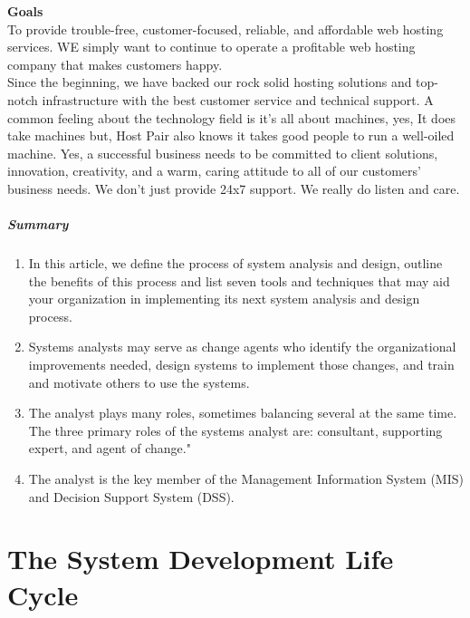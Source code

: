 \documentclass[a4paper,12pt]{report}
\begin{document}
\textbf{Goals}\\
To provide trouble-free, customer-focused, reliable, and affordable web hosting services. WE simply want
to continue to operate a profitable web hosting company that makes customers happy. \\Since the
beginning, we have backed our rock solid hosting solutions and top-notch infrastructure with the best
customer service and technical support. A common feeling about the technology field is it's all about
machines, yes, It does take machines but, Host Pair also knows it takes good people to run a well-oiled
machine. Yes, a successful business needs to be committed to client solutions, innovation, creativity, and
a warm, caring attitude to all of our customers' business needs. We don't just provide 24x7 support. We
really do listen and care.
\paragraph{Summary}
\begin{enumerate}
\item In this article, we define the process of system analysis and design, outline the benefits of this process and list seven tools and techniques that may aid your organization in implementing its next system analysis and design process.
\item Systems analysts may serve as change agents who identify the organizational improvements needed, design systems to implement those changes, and train and motivate others to use the systems.
\item The analyst plays many roles, sometimes balancing several at the same time. The three primary roles of the systems analyst are: consultant, supporting expert, and agent of change."
\item The analyst is the key member of the Management Information System (MIS) and Decision Support System (DSS).
\end{enumerate}
\newpage
\chapter{The System Development Life Cycle }
\end{document}
